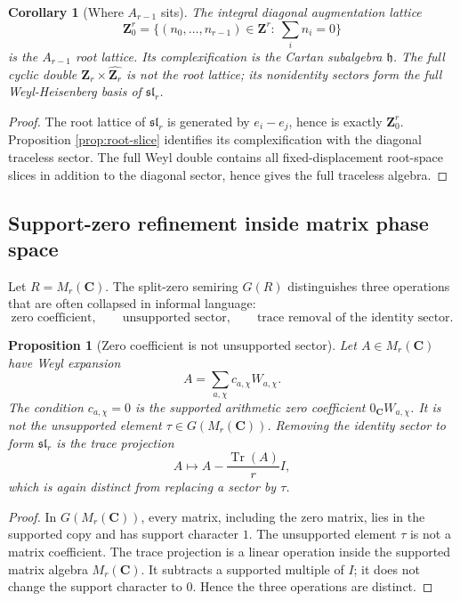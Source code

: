 \documentclass[11pt]{article}
\newcommand{\C}{\mathbf C}
\newcommand{\Z}{\mathbf Z}
\newcommand{\Tr}{\operatorname{Tr}}
\theoremstyle{plain}
\newtheorem{proposition}[theorem]{Proposition}
\newtheorem{corollary}[theorem]{Corollary}
\theoremstyle{definition}
\begin{document}
\begin{corollary}[Where \(A_{r-1}\) sits]\label{cor:A-root-sits}
The integral diagonal augmentation lattice
\[
   \Z_0^r=\{(n_0,\ldots,n_{r-1})\in\Z^r:\ \sum_i n_i=0\}
\]
is the \(A_{r-1}\) root lattice.  Its complexification is the Cartan subalgebra \(\mathfrak h\).  The full cyclic double \(\Z_r\times\widehat{\Z_r}\) is not the root lattice; its nonidentity sectors form the full Weyl-Heisenberg basis of \(\mathfrak{sl}_r\).
\end{corollary}

\begin{proof}
The root lattice of \(\mathfrak{sl}_r\) is generated by \(e_i-e_j\), hence is exactly \(\Z_0^r\).  Proposition \ref{prop:root-slice} identifies its complexification with the diagonal traceless sector.  The full Weyl double contains all fixed-displacement root-space slices in addition to the diagonal sector, hence gives the full traceless algebra.
\end{proof}

\subsection{Support-zero refinement inside matrix phase space}

Let \(R=M_r(\C)\).  The split-zero semiring \(G(R)\) distinguishes three operations that are often collapsed in informal language:
\[
   \text{zero coefficient},
   \qquad
   \text{unsupported sector},
   \qquad
   \text{trace removal of the identity sector}.
\]

\begin{proposition}[Zero coefficient is not unsupported sector]\label{prop:zero-not-unsupported}
Let \(A\in M_r(\C)\) have Weyl expansion
\[
   A=\sum_{a,\chi}c_{a,\chi}W_{a,\chi}.
\]
The condition \(c_{a,\chi}=0\) is the supported arithmetic zero coefficient \(0_\C W_{a,\chi}\).  It is not the unsupported element \(\tau\in G(M_r(\C))\).  Removing the identity sector to form \(\mathfrak{sl}_r\) is the trace projection
\[
   A\mapsto A-\frac{\Tr(A)}rI,
\]
which is again distinct from replacing a sector by \(\tau\).
\end{proposition}

\begin{proof}
In \(G(M_r(\C))\), every matrix, including the zero matrix, lies in the supported copy and has support character \(1\).  The unsupported element \(\tau\) is not a matrix coefficient.  The trace projection is a linear operation inside the supported matrix algebra \(M_r(\C)\).  It subtracts a supported multiple of \(I\); it does not change the support character to \(0\).  Hence the three operations are distinct.
\end{proof}
\end{document}
